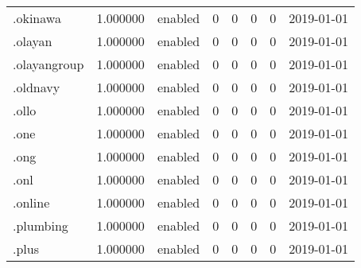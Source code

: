 \begin{tabular}{lrlrrrrl}
.okinawa                  &          1.000000 &         enabled &                           0 &                           0 &                           0 &                   0 &           2019-01-01 \\
.olayan                   &          1.000000 &         enabled &                           0 &                           0 &                           0 &                   0 &           2019-01-01 \\
.olayangroup              &          1.000000 &         enabled &                           0 &                           0 &                           0 &                   0 &           2019-01-01 \\
.oldnavy                  &          1.000000 &         enabled &                           0 &                           0 &                           0 &                   0 &           2019-01-01 \\
.ollo                     &          1.000000 &         enabled &                           0 &                           0 &                           0 &                   0 &           2019-01-01 \\
.one                      &          1.000000 &         enabled &                           0 &                           0 &                           0 &                   0 &           2019-01-01 \\
.ong                      &          1.000000 &         enabled &                           0 &                           0 &                           0 &                   0 &           2019-01-01 \\
.onl                      &          1.000000 &         enabled &                           0 &                           0 &                           0 &                   0 &           2019-01-01 \\
.online                   &          1.000000 &         enabled &                           0 &                           0 &                           0 &                   0 &           2019-01-01 \\
.plumbing                 &          1.000000 &         enabled &                           0 &                           0 &                           0 &                   0 &           2019-01-01 \\
.plus                     &          1.000000 &         enabled &                           0 &                           0 &                           0 &                   0 &           2019-01-01 \\

\end{tabular}
